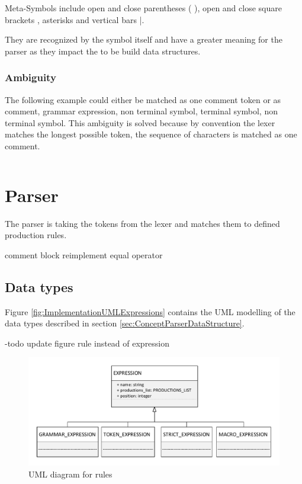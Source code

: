 Meta-Symbols include open and close parentheses \dq( )\dq, open and close square brackets \dq[ ]\dq, asterisks \dq *\dq and vertical bars \dq |\dq.

They are recognized by the symbol itself and have a greater meaning for the parser as they impact the to be build data structures. 

\subsubsection{Ambiguity}

The following example could either be matched as one comment token or as comment, grammar expression, non terminal symbol, terminal symbol, non terminal symbol.
This ambiguity is solved because by convention the lexer matches the longest possible token, the sequence of characters is matched as one comment.
\begin{lstlisting}[basicstyle=\scriptsize	,caption= Commented out production rule,label= lst:Lexer_example]
%----   <formula_role> ::= <user_role>-<source>
\end{lstlisting}
\section{Parser}\label{sec:ImplementationParser}

The parser is taking the tokens from the lexer and matches them to defined production rules.




comment block reimplement equal operator

\subsection{Data types}\label{sec:ImplementationDataTypes}

Figure \ref{fig:ImplementationUMLExpressions} contains the UML modelling of the data types described in section \ref{sec:ConceptParserDataStructure}.

-todo update figure rule instead of expression
\begin{figure}[H]
\centering
\includegraphics[width=1\textwidth]{images/uml_data_types_expressions.pdf}
\caption{UML diagram for rules}
\label{fig:ImplementationUMLRule}
\end{figure}


